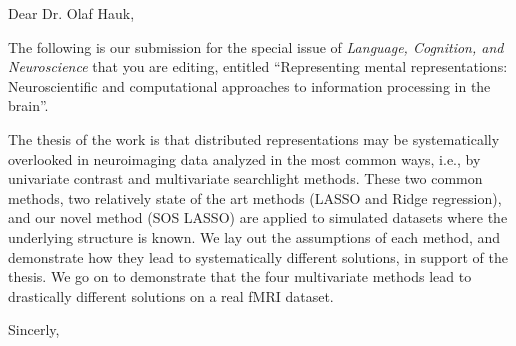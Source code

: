 \documentclass[11pt,letterpaper]{letter}
\begin{document}
 
\begin{letter}{Dear Dr. Olaf Hauk,} 
\opening{The following is our submission for the special issue of {\it Language, Cognition, and Neuroscience} that you are editing, entitled ``Representing mental representations: Neuroscientific and computational approaches to information processing in the brain''.}

The thesis of the work is that distributed representations may be systematically overlooked in neuroimaging data analyzed in the most common ways, i.e., by univariate contrast and multivariate searchlight methods. These two common methods, two relatively state of the art methods (LASSO and Ridge regression), and our novel method (SOS LASSO) are applied to simulated datasets where the underlying structure is known. We lay out the assumptions of each method, and demonstrate how they lead to systematically different solutions, in support of the thesis. We go on to demonstrate that the four multivariate methods lead to drastically different solutions on a real fMRI dataset.
 
 
\closing{Sincerly,\\
 \\
}
\end{letter} 
\end{document}
